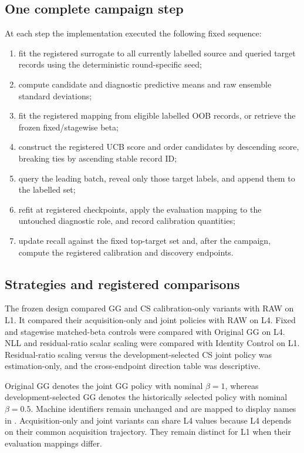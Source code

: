 \documentclass[10pt,twocolumn]{article}
\begin{document}
\subsection{One complete campaign step}
At each step the implementation executed the following fixed sequence:
\begin{enumerate}
\item fit the registered surrogate to all currently labelled source and queried
target records using the deterministic round-specific seed;
\item compute candidate and diagnostic predictive means and raw ensemble
standard deviations;
\item fit the registered mapping from eligible labelled OOB records, or retrieve
the frozen fixed/stagewise beta;
\item construct the registered UCB score and order candidates by descending
score, breaking ties by ascending stable record ID;
\item query the leading batch, reveal only those target labels, and append them
to the labelled set;
\item refit at registered checkpoints, apply the evaluation mapping to the
untouched diagnostic role, and record calibration quantities;
\item update recall against the fixed top-target set and, after the campaign,
compute the registered calibration and discovery endpoints.
\end{enumerate}




\subsection{Strategies and registered comparisons}
The frozen design compared GG and CS calibration-only variants with RAW on L1.
It compared their acquisition-only and joint policies with RAW on L4. Fixed
and stagewise matched-beta controls were compared with Original GG on L4. NLL
and residual-ratio scalar scaling were compared with Identity Control on L1.
Residual-ratio scaling versus the development-selected CS joint policy was
estimation-only, and the cross-endpoint direction table was descriptive.

Original GG denotes the joint GG policy with nominal $\beta=1$, whereas
development-selected GG denotes the historically selected policy with nominal
$\beta=0.5$. Machine identifiers remain unchanged and are mapped to display
names in . Acquisition-only and joint
variants can share L4 values because L4 depends on their common acquisition
trajectory. They remain distinct for L1 when their evaluation mappings differ.
\end{document}
